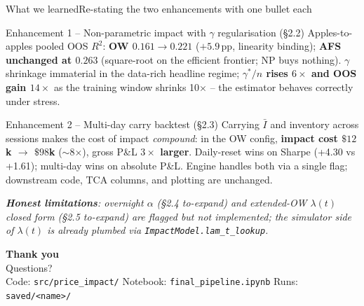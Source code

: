 \documentclass[aspectratio=169,11pt]{beamer}
\newcommand{\hilite}[1]{\textcolor{accent}{\textbf{#1}}}
\begin{document}
\begin{frame}{What we learned}{Re-stating the two enhancements with one bullet each}

  \begin{block}{Enhancement 1 -- Non-parametric impact with $\gamma$ regularisation \hfill (\S2.2)}
    \footnotesize
    Apples-to-apples pooled OOS $R^2$: \hilite{OW $0.161 \to 0.221$} ($+5.9$\,pp, linearity binding);\;
    \hilite{AFS unchanged at $0.263$} (square-root on the efficient frontier; NP buys nothing).\;
    $\gamma$ shrinkage immaterial in the data-rich headline regime; \hilite{$\gamma^*/n$ rises $6\times$ and OOS gain $14\times$} as the training window shrinks 10$\times$ -- the estimator behaves correctly under stress.
  \end{block}

  \begin{block}{Enhancement 2 -- Multi-day carry backtest \hfill (\S2.3)}
    \footnotesize
    Carrying $\bar I$ and inventory across sessions makes the cost of impact \emph{compound}: in the OW config, \hilite{impact cost $\$12$k $\to$ $\$98$k} ($\sim$8$\times$), gross P\&L \hilite{$3\times$ larger}.
    Daily-reset wins on Sharpe (+4.30 vs +1.61); multi-day wins on absolute P\&L.
    Engine handles both via a single flag; downstream code, TCA columns, and plotting are unchanged.
  \end{block}

  \vspace{0.4em}
  \footnotesize\itshape
  \textbf{Honest limitations}: overnight $\alpha$ (\S2.4 \emph{to-expand}) and extended-OW $\lambda(t)$ closed form (\S2.5 \emph{to-expand}) are flagged but not implemented; the simulator side of $\lambda(t)$ is already plumbed via \texttt{ImpactModel.lam\_t\_lookup}.
\end{frame}

\begin{frame}[plain]
  \vfill
  \centering
  {\Huge\bfseries Thank you}\\[1em]
  {\large Questions?}\\[2em]
  \footnotesize
  Code: \texttt{src/price\_impact/} \;\;\textbar\;\;
  Notebook: \texttt{final\_pipeline.ipynb} \;\;\textbar\;\;
  Runs: \texttt{saved/<name>/}
  \vfill
\end{frame}
\end{document}
